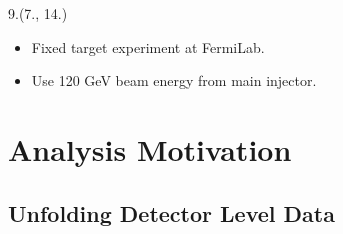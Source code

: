 \documentclass[12pt, xcolor={dvipsnames}, aspectratio = 169, sans, mathserif]{beamer}
\newenvironment{List}[2]
{\begin{textblock}{#1}#2
\begin{itemize}}
{\end{itemize}
\end{textblock}}
\begin{document}
\begin{frame}
\begin{scriptsize}
\begin{List}{9.}{(7., 14.)}
  \item Fixed target experiment at FermiLab.

  \item Use 120 GeV beam energy from main injector.
\end{List}
\end{scriptsize}
\end{frame}

\section{Analysis Motivation}
\subsection{Unfolding Detector Level Data}
\end{document}
